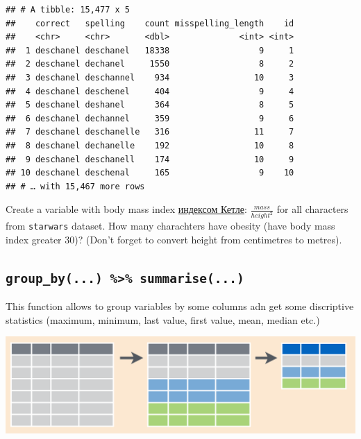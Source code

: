\documentclass[
]{book}
\newenvironment{Shaded}{\begin{snugshade}}{\end{snugshade}}
\newcommand{\KeywordTok}[1]{\textcolor[rgb]{0.13,0.29,0.53}{\textbf{#1}}}
\newcommand{\NormalTok}[1]{#1}
\newcommand{\OperatorTok}[1]{\textcolor[rgb]{0.81,0.36,0.00}{\textbf{#1}}}
\newcommand{\StringTok}[1]{\textcolor[rgb]{0.31,0.60,0.02}{#1}}
\let\BeginKnitrBlock\begin \let\EndKnitrBlock\end
\begin{document}
\begin{verbatim}
## # A tibble: 15,477 x 5
##    correct   spelling    count misspelling_length    id
##    <chr>     <chr>       <dbl>              <int> <int>
##  1 deschanel deschanel   18338                  9     1
##  2 deschanel dechanel     1550                  8     2
##  3 deschanel deschannel    934                 10     3
##  4 deschanel deschenel     404                  9     4
##  5 deschanel deshanel      364                  8     5
##  6 deschanel dechannel     359                  9     6
##  7 deschanel deschanelle   316                 11     7
##  8 deschanel dechanelle    192                 10     8
##  9 deschanel deschanell    174                 10     9
## 10 deschanel deschenal     165                  9    10
## # … with 15,467 more rows
\end{verbatim}

\BeginKnitrBlock{rmdtask}
Create a variable with body mass index \href{https://en.wikipedia.org/wiki/Body_mass_index}{индексом Кетле}: \(\frac{mass}{height^2}\) for all characters from \texttt{starwars} dataset. How many charachters have obesity (have body mass index greater 30)? (Don't forget to convert height from centimetres to metres).
\EndKnitrBlock{rmdtask}

\hypertarget{group_by...-summarise...}{%
\subsection{\texorpdfstring{\texttt{group\_by(...)\ \%\textgreater{}\%\ summarise(...)}}{group\_by(...) \%\textgreater\% summarise(...)}}\label{group_by...-summarise...}}

This function allows to group variables by some columns adn get some discriptive statistics (maximum, minimum, last value, first value, mean, median etc.)

\includegraphics{images/02.05.group_by_s.png}

\begin{Shaded}
\end{Shaded}
\end{document}
